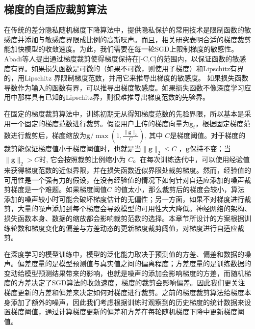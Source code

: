 \subsection{梯度的自适应裁剪算法}
在传统的差分隐私随机梯度下降算法中，提供隐私保护的常用技术是限制函数的敏感度并添加与敏感度界限成比例的高斯噪声。而且，相关研究表明合适的梯度裁剪能加快模型的收敛速度。为此，我们需要在每一轮SGD上限制梯度的敏感性。Abadi等人提出通过梯度裁剪使得梯度保持在[-C,C]的范围内，以保证函数的敏感度有界。如果损失函数是可微的（如果不可微，则使用子梯度）和Lipschitz有界的，用Lipschitz 界限制梯度范数，并用它来推导出梯度的敏感度。 如果损失函数导数作为输入的函数有界，可以推导出梯度敏感度。如果损失函数不像深度学习应用中那样具有已知的Lipschitz界，则很难推导出梯度范数的先验界。

在固定的梯度裁剪算法中，训练初期无从得知梯度范数的先验界限，所以基本是采用一个固定的梯度范数进行裁剪。假设用户上传的梯度向量为$\tilde{\mathbf{g}}_{t}$，根据固定梯度范数进行裁剪后，梯度缩放为$\mathbf{g} / \max \left(1, \frac{\|\mathbf{g}\|_{2}}{C}\right)$, 其中 $C$是梯度阈值。对于梯度的裁剪能保证梯度值小于梯度阈值时，也就是当$\|\mathbf{g}\|_{2} \leq C$ ，$\mathbf{g}$保持不变；当$\|\mathbf{g}\|_{2}>C$时, 它会按照裁剪比例缩小为 $C$。在每次训练迭代中，可以使用经验值来获得梯度范数的近似界限，并在损失函数近似界限处裁剪梯度。然而，经验值的可用性是一个强有力的假设，在没有经验值的情况下如何针对自适应添加的噪声裁剪梯度是一个难题。如果梯度阈值$C$ 的值太小，那么裁剪后的梯度会较小，算法添加的噪声较小时可能会破坏梯度估计的无偏性；另一方面，如果不对梯度进行裁剪，大量的噪声添加到每个梯度会导致模型的可用性大大降低。神经网络的架构、损失函数本身、数据的缩放都会影响裁剪范数的选择。本章节所设计的方案根据训练轮数和梯度变化的偏差与方差动态的更新梯度裁剪阈值，对梯度进行自适应裁剪。


在深度学习的模型训练中，模型的泛化能力取决于预测值的方差、偏差和数据的噪声。偏差度量的是模型预测值与真实值之间的偏离程度；方差度量的是训练数据的变动给模型预测结果带来的影响，也就是噪声的添加会影响梯度的方差，而随机梯度的方差决定了SGD算法的收敛速度，梯度的裁剪会影响偏差。因此我们更关注梯度更新的方差和偏差来决定如何对梯度进行裁剪。之前的梯度裁剪算法给梯度本身添加了额外的噪声，因此我们考虑根据训练时观察到的历史梯度的统计数据来设置梯度阈值，通过计算梯度更新的偏差和方差在每轮随机梯度下降中更新梯度阈值。

